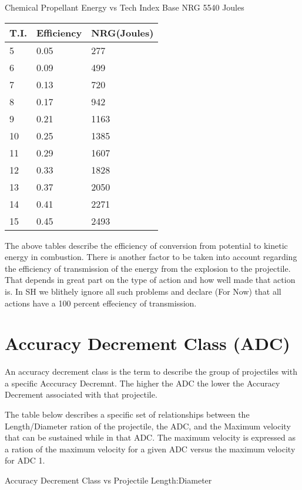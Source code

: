 Chemical Propellant Energy vs Tech Index
Base NRG     5540 Joules

\begin{tabular}{||l|l|l||} \hline 
T.I.        & Efficiency      & NRG(Joules) \\ \hline 
5      		& 0.05            &   277 \\
6      		& 0.09            &   499 \\
7      		& 0.13            &   720 \\
8      		& 0.17            &   942 \\
9      		& 0.21           &   1163 \\
10     		& 0.25           &   1385 \\
11     		& 0.29           &   1607 \\
12     		& 0.33           &   1828 \\
13     		& 0.37           &   2050 \\
14     		& 0.41           &   2271 \\
15     		& 0.45           &   2493 \\ \hline 
\end{tabular}

The above tables describe the efficiency of conversion from 
potential to kinetic energy in combustion. There is another factor to 
be taken into account regarding the efficiency of transmission of the 
energy from the explosion to the projectile. That depends in great 
part on the type of action and how well made that action is. In SH we 
blithely ignore all such problems and declare (For Now) that all 
actions have a 100 percent effeciency of transmission.

\section{Accuracy Decrement Class (ADC)}

An accuracy decrement class is the term to describe the group of 
projectiles with a specific Acccuracy Decremnt. The higher the ADC the 
lower the Accuracy Decrement associated with that projectile. 

The table below describes a specific set of relationships between 
the Length/Diameter ration of the projectile, the ADC, and the 
Maximum velocity that can be sustained while in that ADC. The maximum 
velocity is expressed as a ration of the maximum velocity for a given 
ADC versus the maximum velocity for ADC 1. 


Accuracy Decrement Class vs Projectile Length:Diameter


